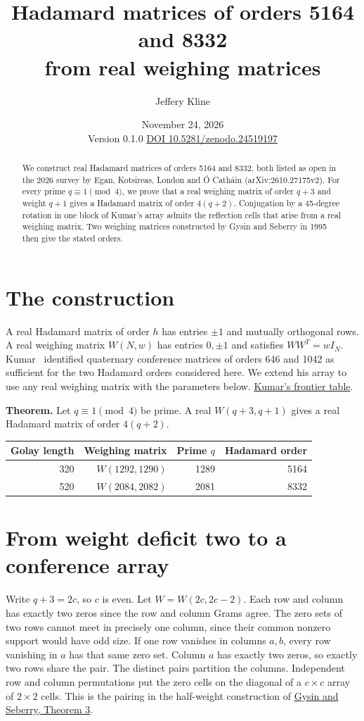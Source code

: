 \documentclass[10pt]{article}
\title{Hadamard matrices of orders 5164 and 8332\\from real weighing matrices}
\author{Jeffery Kline}
\date{November 24, 2026\\[3pt]\small Version 0.1.0 \quad \href{https://doi.org/10.5281/zenodo.24519197}{DOI 10.5281/zenodo.24519197}}
\begin{document}
\maketitle
\begin{abstract}
We construct real Hadamard matrices of orders 5164 and 8332, both listed as open in the 2026 survey by Egan, Kotsireas, London and \'{O} Cath\'ain (arXiv:2610.27175v2). For every prime $q\equiv1\pmod4$, we prove that a real weighing matrix of order $q+3$ and weight $q+1$ gives a Hadamard matrix of order $4(q+2)$. Conjugation by a 45-degree rotation in one block of Kumar's array admits the reflection cells that arise from a real weighing matrix. Two weighing matrices constructed by Gysin and Seberry in 1995 then give the stated orders.
\end{abstract}
\section{The construction}
A real Hadamard matrix of order $h$ has entries $\pm1$ and mutually orthogonal rows. A real weighing matrix $W(N,w)$ has entries $0,\pm1$ and satisfies $WW^T=wI_N$. Kumar~\cite{kumar} identified quaternary conference matrices of orders 646 and 1042 as sufficient for the two Hadamard orders considered here. We extend his array to use any real weighing matrix with the parameters below. \href{https://github.com/vatskishan03/Hadamard/blob/d885022144ba6bf4efa8315e14871a3736947527/FRONTIER.md}{Kumar's frontier table}.

\medskip\noindent\textbf{Theorem.} Let $q\equiv1\pmod4$ be prime. A real $W(q+3,q+1)$ gives a real Hadamard matrix of order $4(q+2)$.

\begin{center}
\begin{tabular}{rrrr}\toprule
Golay length & Weighing matrix & Prime $q$ & Hadamard order\\\midrule
320 & $W(1292,1290)$ & 1289 & 5164\\
520 & $W(2084,2082)$ & 2081 & 8332\\\bottomrule
\end{tabular}
\end{center}
\section{From weight deficit two to a conference array}

Write $q+3=2c$, so $c$ is even. Let $W=W(2c,2c-2)$. Each row and column has exactly two zeros since the row and column Grams agree. The zero sets of two rows cannot meet in precisely one column, since their common nonzero support would have odd size. If one row vanishes in columns $a,b$, every row vanishing in $a$ has that same zero set. Column $a$ has exactly two zeros, so exactly two rows share the pair. The distinct pairs partition the columns. Independent row and column permutations put the zero cells on the diagonal of a $c\times c$ array of $2\times2$ cells. This is the pairing in the half-weight construction of \href{https://ajc.maths.uq.edu.au/pdf/12/ocr-ajc-v12-p157.pdf}{Gysin and Seberry, Theorem 3}.
\end{document}
